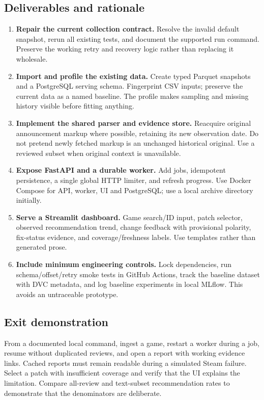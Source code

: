 \documentclass[10pt,letterpaper]{article}
\newcommand{\key}[1]{\textbf{\color{ink}#1}}
\begin{document}
\subsection{Deliverables and rationale}
\begin{enumerate}
\item \key{Repair the current collection contract.} Resolve the invalid default snapshot, rerun all existing tests, and document the supported run command. Preserve the working retry and recovery logic rather than replacing it wholesale.
\item \key{Import and profile the existing data.} Create typed Parquet snapshots and a PostgreSQL serving schema. Fingerprint CSV inputs; preserve the current data as a named baseline. The profile makes sampling and missing history visible before fitting anything.
\item \key{Implement the shared parser and evidence store.} Reacquire original announcement markup where possible, retaining its new observation date. Do not pretend newly fetched markup is an unchanged historical original. Use a reviewed subset when original context is unavailable.
\item \key{Expose FastAPI and a durable worker.} Add jobs, idempotent persistence, a single global HTTP limiter, and refresh progress. Use Docker Compose for API, worker, UI and PostgreSQL; use a local archive directory initially.
\item \key{Serve a Streamlit dashboard.} Game search/ID input, patch selector, observed recommendation trend, change feedback with provisional polarity, fix-status evidence, and coverage/freshness labels. Use templates rather than generated prose.
\item \key{Include minimum engineering controls.} Lock dependencies, run schema/offset/retry smoke tests in GitHub Actions, track the baseline dataset with DVC metadata, and log baseline experiments in local MLflow. This avoids an untraceable prototype.
\end{enumerate}

\subsection{Exit demonstration}
From a documented local command, ingest a game, restart a worker during a job, resume without duplicated reviews, and open a report with working evidence links. Cached reports must remain readable during a simulated Steam failure. Select a patch with insufficient coverage and verify that the UI explains the limitation. Compare all-review and text-subset recommendation rates to demonstrate that the denominators are deliberate.
\end{document}
